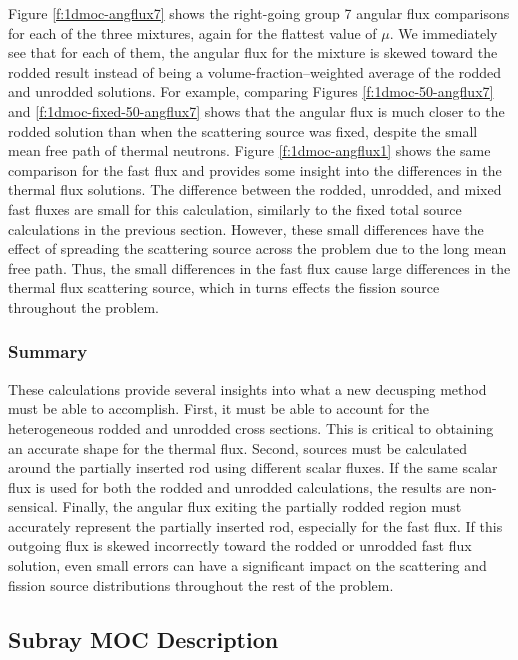 Figure \ref{f:1dmoc-angflux7} shows the right-going group 7 angular flux comparisons for each of the three mixtures, again for the flattest value of $\mu$.  We immediately see that for each of them, the angular flux for the mixture is skewed toward the rodded result instead of being a volume-fraction--weighted average of the rodded and unrodded solutions.  For example, comparing Figures \ref{f:1dmoc-50-angflux7} and \ref{f:1dmoc-fixed-50-angflux7} shows that the angular flux is much closer to the rodded solution than when the scattering source was fixed, despite the small mean free path of thermal neutrons.  Figure \ref{f:1dmoc-angflux1} shows the same comparison for the fast flux and provides some insight into the differences in the thermal flux solutions.  The difference between the rodded, unrodded, and mixed fast fluxes are small for this calculation, similarly to the fixed total source calculations in the previous section.  However, these small differences have the effect of spreading the scattering source across the problem due to the long mean free path.  Thus, the small differences in the fast flux cause large differences in the thermal flux scattering source, which in turns effects the fission source throughout the problem.

\subsubsection{Summary}

These calculations provide several insights into what a new decusping method must be able to accomplish.  First, it must be able to account for the heterogeneous rodded and unrodded cross sections.  This is critical to obtaining an accurate shape for the thermal flux.  Second, sources must be calculated around the partially inserted rod using different scalar fluxes.  If the same scalar flux is used for both the rodded and unrodded calculations, the results are non-sensical.  Finally, the angular flux exiting the partially rodded region must accurately represent the partially inserted rod, especially for the fast flux.  If this outgoing flux is skewed incorrectly toward the rodded or unrodded fast flux solution, even small errors can have a significant impact on the scattering and fission source distributions throughout the rest of the problem.

\subsection{Subray MOC Description}

